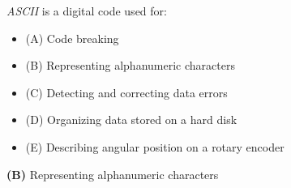 

{\it ASCII} is a digital code used for:

\begin{itemize}
\item{(A)} Code breaking
\vskip 5pt 
\item{(B)} Representing alphanumeric characters
\vskip 5pt 
\item{(C)} Detecting and correcting data errors
\vskip 5pt 
\item{(D)} Organizing data stored on a hard disk
\vskip 5pt 
\item{(E)} Describing angular position on a rotary encoder
\end{itemize}







{\bf (B)} Representing alphanumeric characters
 










